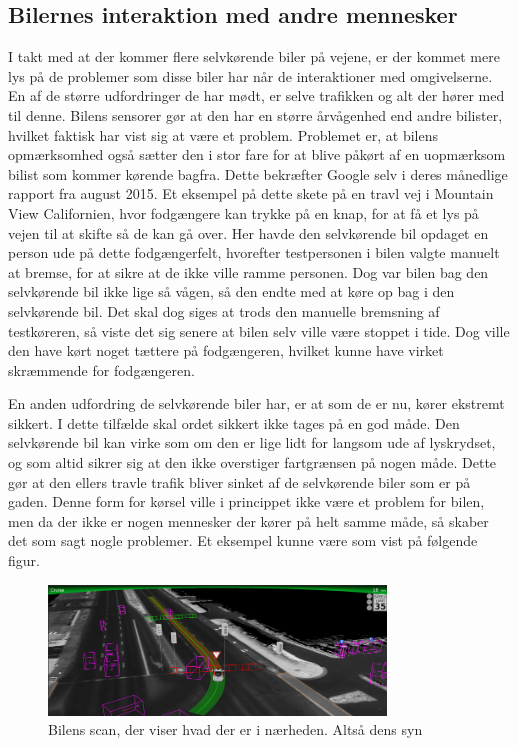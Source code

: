 \subsection{Bilernes interaktion med andre mennesker}
I takt med at der kommer flere  selvkørende biler på vejene, er der kommet mere lys på de problemer som disse biler har når de interaktioner med omgivelserne. En af de større udfordringer de har mødt, er selve trafikken og alt der hører med til denne. Bilens sensorer gør at den har en større årvågenhed end andre bilister, hvilket faktisk har vist sig at være et problem. Problemet er, at bilens opmærksomhed også sætter den i stor fare for at blive påkørt af en uopmærksom bilist som kommer kørende bagfra. Dette bekræfter Google selv i deres månedlige rapport fra august 2015\cite{GOOG_MONTHLY}. Et eksempel på dette skete på en travl vej i Mountain View Californien, hvor fodgængere kan trykke på en knap, for at få et lys på vejen til at skifte så de kan gå over. Her havde den selvkørende bil opdaget en person ude på dette fodgængerfelt, hvorefter testpersonen i bilen valgte  manuelt at bremse, for at sikre at de ikke ville ramme personen. Dog var bilen bag den selvkørende bil ikke lige så vågen, så den endte med at køre op bag i  den selvkørende bil. Det skal dog siges at trods den manuelle bremsning af testkøreren, så viste det sig senere at bilen selv ville være stoppet i tide. Dog ville den have kørt noget tættere på fodgængeren, hvilket kunne have virket skræmmende for fodgængeren\cite{GOOG_MONTHLY}. 

En anden udfordring de selvkørende biler har, er at som de er nu, kører ekstremt sikkert. I dette tilfælde skal ordet sikkert ikke tages på en god måde. Den selvkørende bil kan virke som om den er lige lidt for langsom ude af lyskrydset, og som altid sikrer sig at den ikke overstiger fartgrænsen på nogen måde. Dette gør at den ellers travle trafik bliver sinket af de selvkørende biler som er på gaden. Denne form for kørsel ville i princippet ikke være et problem for bilen, men da der ikke er nogen mennesker der kører på helt samme måde, så skaber det som sagt nogle problemer. Et eksempel kunne være som vist på følgende figur.

\begin{figure}[h!]
    \centering
    \includegraphics[width=0.8\textwidth]{images/google_vision.png}
    \caption{Bilens scan, der viser hvad der er i nærheden. Altså dens syn}
    \label{fig:car_vision}
\end{figure}

